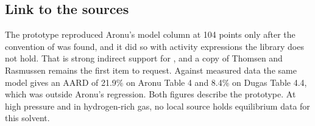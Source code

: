 \subsection*{Link to the sources}
The prototype reproduced Aronu's model column at 104 points only after the convention of  was found, and it did so with activity expressions the library does not hold. That is strong indirect support for , and a copy of Thomsen and Rasmussen remains the first item to request. Against measured data the same model gives an AARD of 21.9\% on Aronu Table 4 and 8.4\% on Dugas Table 4.4, which was outside Aronu's regression. Both figures describe the prototype. At high pressure and in hydrogen-rich gas, no local source holds equilibrium data for this solvent.
